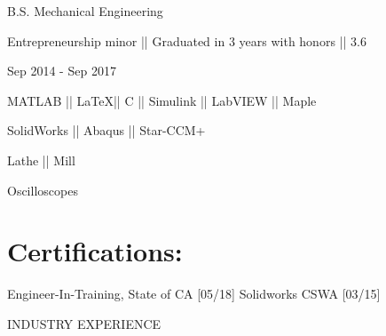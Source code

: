 \documentclass[letterpaper,10pt,oneside]{article}
\begin{document}
\begin{body}
\vspace{1ex}

{{\small B.S. Mechanical Engineering}}
\begin{detail}
\BulletItem
Entrepreneurship minor || Graduated in 3 years with honors || 3.6
\end{detail}

\begin{subtitle}
\vspace{-8ex}
{{Sep 2014 - Sep 2017}}
\end{subtitle}
\vspace{1ex}

\vspace{-1ex}


\vspace{-1.5ex}
{
\vspace{1.8ex}
\color{cyan}\small
{MATLAB || \LaTeX || C || Simulink || LabVIEW || Maple} %
}

{
\vspace{-2.5ex}\hspace{3.17in}
\color{cyan}\small
{SolidWorks || Abaqus || Star-CCM+} %
}

{
\vspace{-0.5ex}
\color{cyan}\small
{Lathe || Mill} %
}

{
\vspace{-2.5ex}\hspace{3.17in}
\color{cyan}\small
{Oscilloscopes} %
}


\vspace{-2.5ex}
\section
{Certifications:}{}

\vspace{-2.0ex}
\begin{detail}
Engineer-In-Training, State of CA [05/18]  
\newline
Solidworks CSWA [03/15]
\end{detail}

\vspace{1ex}



{
\hspace{-1.72in}\noindent\color{cblue}
{INDUSTRY EXPERIENCE} %
}


\end{body}
\end{document}
